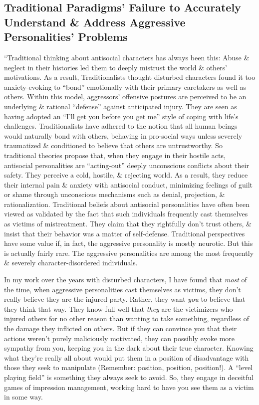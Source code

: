 \documentclass{article}
\numberwithin{equation}{section}
\begin{document}
\subsection{Traditional Paradigms' Failure to Accurately Understand \& Address Aggressive Personalities' Problems}
``Traditional thinking about antisocial characters has always been this: Abuse \& neglect in their histories led them to deeply mistrust the world \& others' motivations. As a result, Traditionalists thought disturbed characters found it too anxiety-evoking to ``bond'' emotionally with their primary caretakers as well as others. Within this model, aggressors' offensive postures are perceived to be an underlying \& rational ``defense'' against anticipated injury. They are seen as having adopted an ``I'll get you before you get me'' style of coping with life's challenges. Traditionalists have adhered to the notion that all human beings would naturally bond with others, behaving in pro-social ways unless severely traumatized \& conditioned to believe that others are untrustworthy. So traditional theories propose that, when they engage in their hostile acts, antisocial personalities are ``acting-out'' deeply unconscious conflicts about their safety. They perceive a cold, hostile, \& rejecting world. As a result, they reduce their internal pain \& anxiety with antisocial conduct, minimizing feelings of guilt or shame through unconscious mechanisms such as denial, projection, \& rationalization. Traditional beliefs about antisocial personalities have often been viewed as validated by the fact that such individuals frequently cast themselves as victims of mistreatment. They claim that they rightfully don't trust others, \& insist that their behavior was a matter of self-defense. Traditional perspectives have some value if, in fact, the aggressive personality is mostly neurotic. But this is actually fairly rare. The aggressive personalities are among the most frequently \& severely character-disordered individuals.

In my work over the years with disturbed characters, I have found that \textit{most} of the time, when aggressive personalities cast themselves as victims, they don't really believe they are the injured party. Rather, they want \textit{you} to believe that they think that way. They know full well that \textit{they} are the victimizers who injured others for no other reason than wanting to take something, regardless of the damage they inflicted on others. But if they can convince you that their actions weren't purely maliciously motivated, they can possibly evoke more sympathy from you, keeping you in the dark about their true character. Knowing what they're really all about would put them in a position of disadvantage with those they seek to manipulate (Remember: position, position, position!). A ``level playing field'' is something they always seek to avoid. So, they engage in deceitful games of impression management, working hard to have you see them as a victim in some way.
\end{document}
